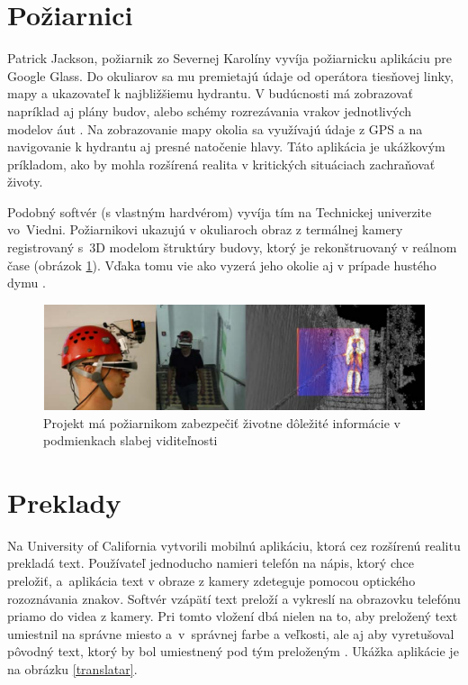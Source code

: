\section{Požiarnici}

Patrick Jackson, požiarnik zo Severnej Karolíny vyvíja požiarnicku aplikáciu pre Google Glass. Do okuliarov sa mu premietajú údaje od operátora tiesňovej linky, mapy a ukazovateľ k najbližšiemu hydrantu. V budúcnosti má zobrazovať napríklad aj plány budov, alebo schémy rozrezávania vrakov
jednotlivých modelov áut \cite{Google14-a}. Na zobrazovanie mapy okolia sa využívajú údaje z GPS a na navigovanie k hydrantu aj presné natočenie hlavy. Táto aplikácia je ukážkovým príkladom, ako by mohla rozšírená realita v kritických situáciach zachraňovať životy.

Podobný softvér (s vlastným hardvérom) vyvíja tím na Technickej univerzite vo~Viedni. Požiarnikovi ukazujú v okuliaroch obraz z termálnej kamery registrovaný s~3D modelom štruktúry budovy, ktorý je rekonštruovaný v reálnom čase (obrázok \ref{poziarnici}). Vďaka tomu vie ako vyzerá jeho okolie aj v prípade hustého dymu \cite{Schonauer13}.

\begin{figure}[h]
 \centering
 \includegraphics[max width=\textwidth]{pictures/wien-firefighters.png}
 \caption{Projekt má požiarnikom zabezpečiť životne dôležité informácie v podmienkach slabej viditeľnosti \cite{Schonauer13}}
 \label{poziarnici}
 \end{figure}

\section{Preklady}

Na University of California vytvorili mobilnú aplikáciu, ktorá cez rozšírenú realitu prekladá text. Používateľ jednoducho namieri telefón na nápis, ktorý chce preložiť, a~aplikácia text v obraze z kamery zdeteguje pomocou optického rozoznávania znakov. Softvér vzápätí text preloží a vykreslí na obrazovku telefónu priamo do videa z kamery. Pri tomto vložení dbá nielen na to, aby preložený text umiestnil na správne miesto a~v~správnej farbe a veľkosti, ale aj aby vyretušoval pôvodný text, ktorý by bol umiestnený pod tým preloženým \cite{Fragoso11}. Ukážka aplikácie je na obrázku \ref{translatar}.

